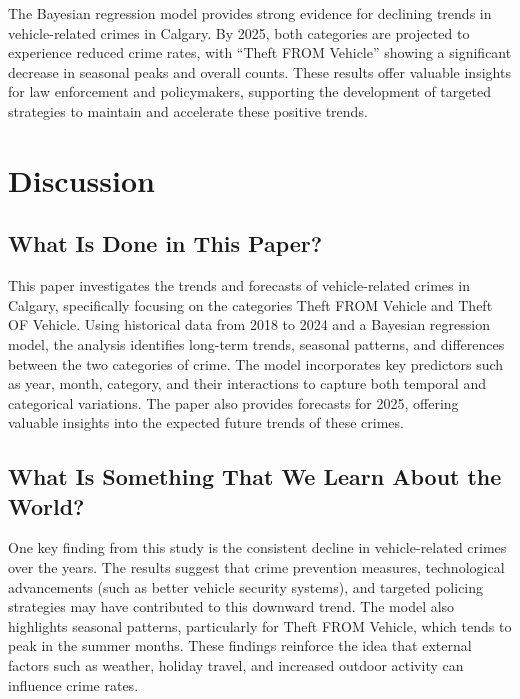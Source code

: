 \documentclass[
  letterpaper,
  DIV=11,
  numbers=noendperiod]{scrartcl}
\begin{document}
The Bayesian regression model provides strong evidence for declining
trends in vehicle-related crimes in Calgary. By 2025, both categories
are projected to experience reduced crime rates, with ``Theft FROM
Vehicle'' showing a significant decrease in seasonal peaks and overall
counts. These results offer valuable insights for law enforcement and
policymakers, supporting the development of targeted strategies to
maintain and accelerate these positive trends.

\section{Discussion}\label{discussion}

\subsection{What Is Done in This
Paper?}\label{what-is-done-in-this-paper}

This paper investigates the trends and forecasts of vehicle-related
crimes in Calgary, specifically focusing on the categories Theft FROM
Vehicle and Theft OF Vehicle. Using historical data from 2018 to 2024
and a Bayesian regression model, the analysis identifies long-term
trends, seasonal patterns, and differences between the two categories of
crime. The model incorporates key predictors such as year, month,
category, and their interactions to capture both temporal and
categorical variations. The paper also provides forecasts for 2025,
offering valuable insights into the expected future trends of these
crimes.

\subsection{What Is Something That We Learn About the
World?}\label{what-is-something-that-we-learn-about-the-world}

One key finding from this study is the consistent decline in
vehicle-related crimes over the years. The results suggest that crime
prevention measures, technological advancements (such as better vehicle
security systems), and targeted policing strategies may have contributed
to this downward trend. The model also highlights seasonal patterns,
particularly for Theft FROM Vehicle, which tends to peak in the summer
months. These findings reinforce the idea that external factors such as
weather, holiday travel, and increased outdoor activity can influence
crime rates.
\end{document}
